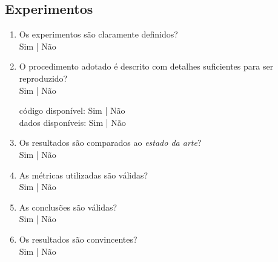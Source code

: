 \documentclass{UnBExam}%
\begin{document}
	\subsection{Experimentos}%
	\begin{enumerate}
		\item Os experimentos são claramente definidos?\\%
		Sim | Não

		\item O procedimento adotado é descrito com detalhes suficientes para
		ser reproduzido?\\%
		Sim | Não%
		\hfill\begin{minipage}{.29\textwidth}%
		\hfill código disponível: Sim | Não\\%
		\hfill dados disponíveis: Sim | Não%
		\end{minipage}%

		\item Os resultados são comparados ao \emph{estado da arte}?\\%
		Sim | Não

		\item As métricas utilizadas são válidas?\\%
		Sim | Não

		\item As conclusões são válidas?\\%
		Sim | Não

		\item Os resultados são convincentes?\\%
		Sim | Não
	\end{enumerate}%
\end{document}
